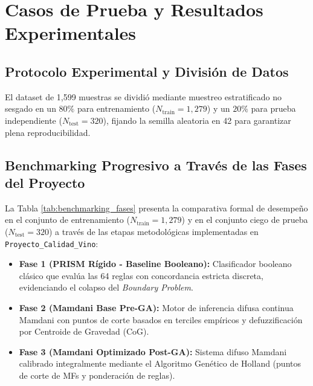 \documentclass{article}
\begin{document}

\section{Casos de Prueba y Resultados Experimentales}

\subsection{Protocolo Experimental y División de Datos}

El dataset de 1,599 muestras se dividió mediante muestreo estratificado no sesgado en un $80\%$ para entrenamiento ($N_{\text{train}} = 1,279$) y un $20\%$ para prueba independiente ($N_{\text{test}} = 320$), fijando la semilla aleatoria en 42 para garantizar plena reproducibilidad.

\subsection{Benchmarking Progresivo a Través de las Fases del Proyecto}

La Tabla \ref{tab:benchmarking_fases} presenta la comparativa formal de desempeño en el conjunto de entrenamiento ($N_{\text{train}}=1,279$) y en el conjunto ciego de prueba ($N_{\text{test}}=320$) a través de las etapas metodológicas implementadas en \texttt{Proyecto\_Calidad\_Vino}:
\begin{itemize}
    \item \textbf{Fase 1 (PRISM Rígido - Baseline Booleano):} Clasificador booleano clásico que evalúa las 64 reglas con concordancia estricta discreta, evidenciando el colapso del \textit{Boundary Problem}.
    \item \textbf{Fase 2 (Mamdani Base Pre-GA):} Motor de inferencia difusa continua Mamdani con puntos de corte basados en terciles empíricos y defuzzificación por Centroide de Gravedad (CoG).
    \item \textbf{Fase 3 (Mamdani Optimizado Post-GA):} Sistema difuso Mamdani calibrado integralmente mediante el Algoritmo Genético de Holland (puntos de corte de MFs y ponderación de reglas).
\end{itemize}
\end{document}
